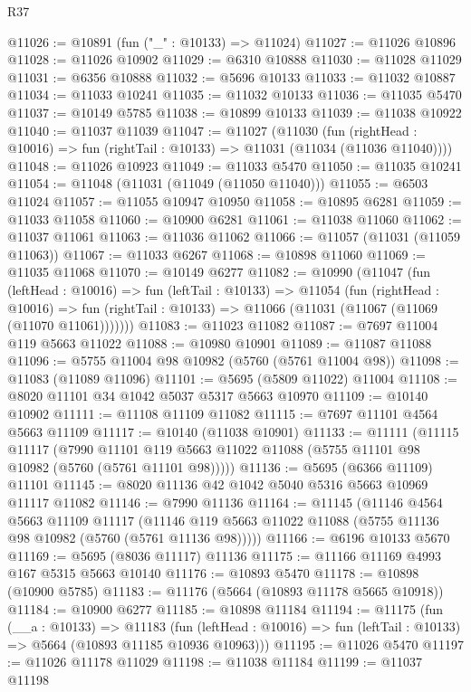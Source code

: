 \begin{lexlean}{R37}
\begin{coremodule}
@11026 := @10891 (fun ("_" : @10133) => @11024)
@11027 := @11026 @10896
@11028 := @11026 @10902
@11029 := @6310 @10888
@11030 := @11028 @11029
@11031 := @6356 @10888
@11032 := @5696 @10133
@11033 := @11032 @10887
@11034 := @11033 @10241
@11035 := @11032 @10133
@11036 := @11035 @5470
@11037 := @10149 @5785
@11038 := @10899 @10133
@11039 := @11038 @10922
@11040 := @11037 @11039
@11047 := @11027
    (@11030
      (fun (rightHead : @10016) => fun (rightTail : @10133) => @11031 (@11034 (@11036 @11040))))
@11048 := @11026 @10923
@11049 := @11033 @5470
@11050 := @11035 @10241
@11054 := @11048 (@11031 (@11049 (@11050 @11040)))
@11055 := @6503 @11024
@11057 := @11055 @10947 @10950
@11058 := @10895 @6281
@11059 := @11033 @11058
@11060 := @10900 @6281
@11061 := @11038 @11060
@11062 := @11037 @11061
@11063 := @11036 @11062
@11066 := @11057 (@11031 (@11059 @11063))
@11067 := @11033 @6267
@11068 := @10898 @11060
@11069 := @11035 @11068
@11070 := @10149 @6277
@11082 := @10990
    (@11047
      (fun (leftHead : @10016) =>
      fun (leftTail : @10133) =>
      @11054
        (fun (rightHead : @10016) =>
        fun (rightTail : @10133) => @11066 (@11031 (@11067 (@11069 (@11070 @11061)))))))
@11083 := @11023 @11082
@11087 := @7697 @11004 @119 @5663 @11022
@11088 := @10980 @10901
@11089 := @11087 @11088
@11096 := @5755 @11004 @98 @10982 (@5760 (@5761 @11004 @98))
@11098 := @11083 (@11089 @11096)
@11101 := @5695 (@5809 @11022) @11004
@11108 := @8020 @11101 @34 @1042 @5037 @5317 @5663 @10970
@11109 := @10140 @10902
@11111 := @11108 @11109 @11082
@11115 := @7697 @11101 @4564 @5663 @11109
@11117 := @10140 (@11038 @10901)
@11133 := @11111
    (@11115
      @11117
      (@7990 @11101 @119 @5663 @11022 @11088 (@5755 @11101 @98 @10982 (@5760 (@5761 @11101 @98)))))
@11136 := @5695 (@6366 @11109) @11101
@11145 := @8020 @11136 @42 @1042 @5040 @5316 @5663 @10969 @11117 @11082
@11146 := @7990 @11136
@11164 := @11145
    (@11146
      @4564
      @5663
      @11109
      @11117
      (@11146 @119 @5663 @11022 @11088 (@5755 @11136 @98 @10982 (@5760 (@5761 @11136 @98)))))
@11166 := @6196 @10133 @5670
@11169 := @5695 (@8036 @11117) @11136
@11175 := @11166 @11169 @4993 @167 @5315 @5663 @10140
@11176 := @10893 @5470
@11178 := @10898 (@10900 @5785)
@11183 := @11176 (@5664 (@10893 @11178 @5665 @10918))
@11184 := @10900 @6277
@11185 := @10898 @11184
@11194 := @11175
    (fun (__a : @10133) =>
    @11183
      (fun (leftHead : @10016) => fun (leftTail : @10133) => @5664 (@10893 @11185 @10936 @10963)))
@11195 := @11026 @5470
@11197 := @11026 @11178 @11029
@11198 := @11038 @11184
@11199 := @11037 @11198

\end{coremodule}
\end{lexlean}
